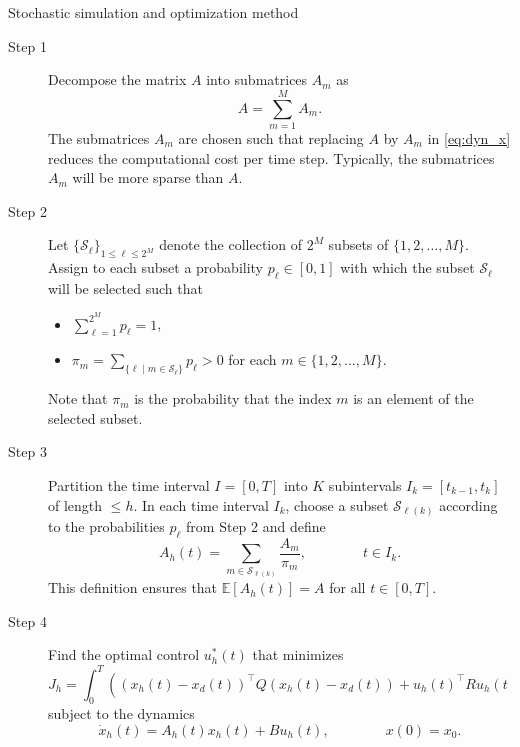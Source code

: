 \documentclass[mathserif]{beamer}
\begin{document}
\begin{frame}
\begin{columns}[T]
\begin{column}{.45\textwidth}
      \begin{block}{Stochastic simulation and optimization method}
\begin{description}
\item[Step 1] Decompose the matrix $A$ into  submatrices $A_m$ as
      \begin{equation}
      A = \sum_{m=1}^M A_m. \label{eq:sumA}
      \end{equation}
      The submatrices $A_m$ are chosen such that replacing $A$ by $A_m$ in \eqref{eq:dyn_x} reduces the computational cost per time step. Typically, the submatrices $A_m$ will be more sparse than $A$. 
      \item[Step 2] Let $\{ \mathcal{S}_\ell \}_{1 \leq \ell \leq 2^M}$ denote the collection of $2^M$ subsets of $\{ 1,2, \ldots, M \}$. \\
      Assign to each subset a probability $p_\ell \in [0,1]$  with which the subset $\mathcal{S}_\ell$ will be selected such that
		\begin{itemize}
		\item $\sum_{\ell=1}^{2^M} p_\ell = 1$,
		\item $\pi_m = \sum_{\{ \ell \mid m \in \mathcal{S}_\ell \} } p_\ell > 0$ for each $m \in \{1,2, \ldots , M \}$.
\end{itemize}		      
      Note that $\pi_m$ is the probability that the index $m$ is an element of the selected subset. 
      \item[Step 3] Partition the time interval $I = [0,T]$ into $K$ subintervals $I_k = [t_{k-1}, t_k]$ of length $\leq h$. In each time interval $I_k$, choose a subset $\mathcal{S}_{\ell(k)}$ according to the probabilities $p_\ell$ from Step 2 and define
      \begin{equation}
      A_h(t) = \sum_{m \in \mathcal{S}_{\ell(k)}} \frac{A_m}{\pi_m}, \qquad \qquad t \in I_k.
      \end{equation}
      This definition ensures that $\mathbb{E}[A_h(t)] = A$ for all $t \in [0,T]$. 
      \item[Step 4] Find the optimal control $u_h^*(t)$ that minimizes 
      \begin{equation}
      J_h = \int_0^T \left( (x_h(t)-x_d(t))^\top Q (x_h(t)-x_d(t)) + u_h(t)^\top R u_h(t) \right) \ \mathrm{d}t,
      \label{eq:cost_xh}
      \end{equation}
      subject to the dynamics
	  \begin{equation}
	  \dot{x}_h(t) = A_h(t)x_h(t) + Bu_h(t),  \qquad \qquad x(0) = x_0. \label{eq:dyn_xh}
	  \end{equation}  	  
\end{description}     


\end{block}
\end{column}
\end{columns}
\end{frame}
\end{document}

